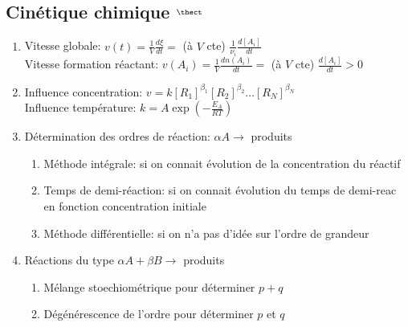 \documentclass[fleqn]{article}
\theoremstyle{definition} \newtheorem*{defi}{D\'efinition}
\theoremstyle{definition} \newtheorem*{theo}{Th\'eor\`eme}
\theoremstyle{definition} \newtheorem*{coro}{Corollaire}
\theoremstyle{remark} \newtheorem*{rqs}{Remarques}
\theoremstyle{definition} \newtheorem*{prop}{Propri\'et\'e}
\begin{document}
\subsection{Cin\'etique chimique $^{\thect}$}
\begin{enumerate}
	\item Vitesse globale: $v(t) = \frac{1}{V} \frac{d \xi}{dt} = $ (\`a $V$ cte) $\frac{1}{\nu_i} \frac{d[A_i]}{dt}$ \\
		Vitesse formation r\'eactant: $v(A_i) = \frac{1}{V} \frac{d n(A_i)}{dt} = $ (\`a $V$ cte) $\frac{d[A_i]}{dt} > 0$
	\item Influence concentration: $v = k[R_1]^{\beta_1} [R_2]^{\beta_2} \hdots [R_N]^{\beta_N}$\\
		Influence temp\'erature: $k = A \exp (-\frac{E_A}{RT})$
	\item D\'etermination des ordres de r\'eaction: $\alpha A \rightarrow$ produits
	\begin{enumerate}
		\item M\'ethode int\'egrale: si on connait \'evolution de la concentration du r\'eactif
		\item Temps de demi-r\'eaction: si on connait \'evolution du temps de demi-reac en fonction concentration initiale
		\item M\'ethode diff\'erentielle: si on n'a pas d'id\'ee sur l'ordre de grandeur
	\end{enumerate}
	\item R\'eactions du type $\alpha A + \beta B \rightarrow $ produits
	\begin{enumerate}
		\item M\'elange stoechiom\'etrique pour d\'eterminer $p+q$
		\item D\'eg\'en\'erescence de l'ordre pour d\'eterminer $p$ et $q$
	\end{enumerate}
\end{enumerate}
\end{document}
